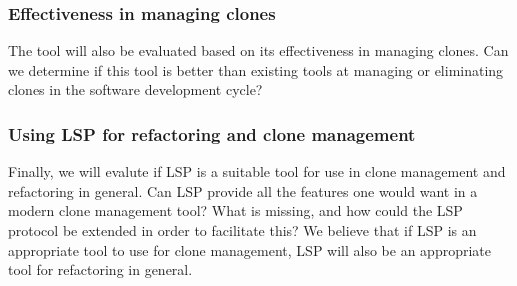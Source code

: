 \documentclass[12pt]{article}
\begin{document}
\subsubsection{Effectiveness in managing clones}

The tool will also be evaluated based on its effectiveness in managing clones. Can we
determine if this tool is better than existing tools at managing or eliminating clones in
the software development cycle?

\subsubsection{Using LSP for refactoring and clone management}

Finally, we will evalute if LSP is a suitable tool for use in clone management and
refactoring in general. Can LSP provide all the features one would want in a modern clone
management tool? What is missing, and how could the LSP protocol be extended in order to
facilitate this? We believe that if LSP is an appropriate tool to use for clone
management, LSP will also be an appropriate tool for refactoring in general.






\end{document}
